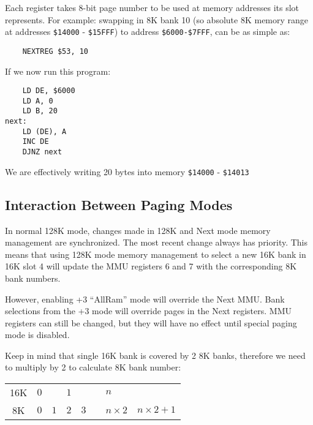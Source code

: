 \documentclass[12pt,twoside,openright,a4paper]{book}
\newcommand{\ddd}{\makebox[1em][c]{.\hfil.\hfil.}}
\begin{document}
Each register takes 8-bit page number to be used at memory addresses its slot represents. For example: swapping in 8K bank 10 (so absolute 8K memory range at addresses {\tt \$14000} - {\tt \$15FFF}) to address {\tt \$6000-\$7FFF}, can be as simple as:

\begin{Verbatim}
	NEXTREG $53, 10
\end{Verbatim}

If we now run this program:

\begin{Verbatim}
	LD DE, $6000
	LD A, 0
	LD B, 20
next:
	LD (DE), A
	INC DE
	DJNZ next
\end{Verbatim}

We are effectively writing 20 bytes into memory {\tt \$14000} - {\tt \$14013}

\pagebreak
\subsection{Interaction Between Paging Modes}

In normal 128K mode, changes made in 128K and Next mode memory management are synchronized. The most recent change always has priority. This means that using 128K mode memory management to select a new 16K bank in 16K slot 4 will update the MMU registers 6 and 7 with the corresponding 8K bank numbers.

However, enabling +3 ``AllRam'' mode will override the Next MMU. Bank selections from the +3 mode will override pages in the Next registers. MMU registers can still be changed, but they will have no effect until special paging mode is disabled.

Keep in mind that single 16K bank is covered by 2 8K banks, therefore we need to multiply by 2 to calculate 8K bank number:

{
	\def\arraystretch{1.5}
	\newcommand{\BankSize}[1]{#1}
	\newcommand{\BankNumber}[1]{#1}
	\begin{tabular}{|c|p{1cm}|p{1cm}|p{1cm}|p{1cm}|c|l|l|}
		\hline
		\BankSize{16K} & 
			\multicolumn{2}{l|}{\BankNumber{$0$}} & 
			\multicolumn{2}{l|}{\BankNumber{$1$}} & 
			\multirow{2}{*}{\ddd} & 
			\multicolumn{2}{l|}{\BankNumber{$n$}} \\
		\cline{1-5}
		\cline{7-8}
		\BankSize{8K} &
			\BankNumber{$0$} & 
			\BankNumber{$1$} & 
			\BankNumber{$2$} & 
			\BankNumber{$3$} &
			& 
			\BankNumber{$n \times 2$}  & 
			\BankNumber{$n \times 2 + 1$} \\
		\hline
	\end{tabular}
}
\end{document}
